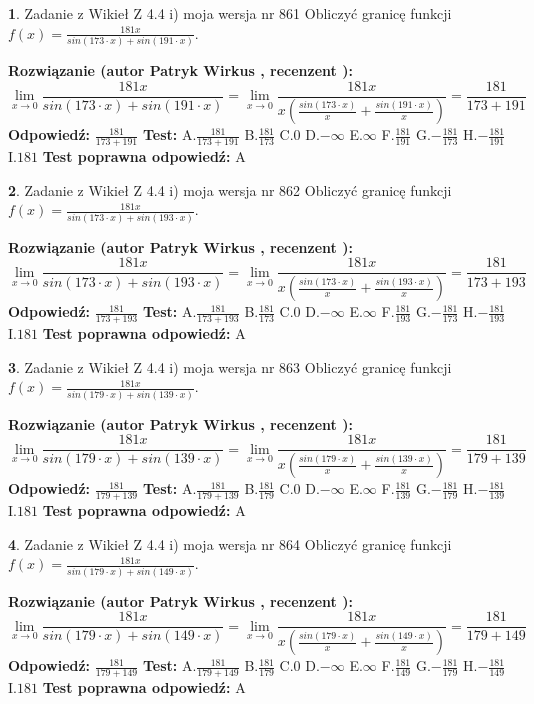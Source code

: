 \documentclass[12pt, a4paper]{article}
\theoremstyle{definition} %
\newtheorem{zad}{}
\newcommand{\zadStart}[1]{\begin{zad}#1\newline}
\newcommand{\zadStop}{\end{zad}}
\newcommand{\rozwStart}[2]{\noindent \textbf{Rozwiązanie (autor #1 , recenzent #2): }\newline}
\newcommand{\rozwStop}{\newline}
\newcommand{\odpStart}{\noindent \textbf{Odpowiedź:}\newline}
\newcommand{\odpStop}{\newline}
\newcommand{\testStart}{\noindent \textbf{Test:}\newline}
\newcommand{\testStop}{\newline}
\newcommand{\kluczStart}{\noindent \textbf{Test poprawna odpowiedź:}\newline}
\newcommand{\kluczStop}{\newline}
\begin{document}
\zadStart{Zadanie z Wikieł Z 4.4 i) moja wersja nr 861}
Obliczyć granicę funkcji $f(x)=\frac{181x}{sin(173\cdot x) +sin(191\cdot x)}$.
\zadStop
\rozwStart{Patryk Wirkus}{}
$$\lim\limits_{x\to 0}\frac{181x}{sin(173\cdot x) +sin(191\cdot x)}=\lim\limits_{x\to 0}\frac{181x}{x(\frac{sin(173\cdot x)}{x}+\frac{sin(191\cdot x)}{x})}=\frac{181}{173+191}$$
\rozwStop
\odpStart
$\frac{181}{173+191}$
\odpStop
\testStart
A.$\frac{181}{173+191}$
B.$\frac{181}{173}$
C.$0$
D.$-\infty$
E.$\infty$
F.$\frac{181}{191}$
G.$-\frac{181}{173}$
H.$-\frac{181}{191}$
I.$181$
\testStop
\kluczStart
A
\kluczStop



\zadStart{Zadanie z Wikieł Z 4.4 i) moja wersja nr 862}
Obliczyć granicę funkcji $f(x)=\frac{181x}{sin(173\cdot x) +sin(193\cdot x)}$.
\zadStop
\rozwStart{Patryk Wirkus}{}
$$\lim\limits_{x\to 0}\frac{181x}{sin(173\cdot x) +sin(193\cdot x)}=\lim\limits_{x\to 0}\frac{181x}{x(\frac{sin(173\cdot x)}{x}+\frac{sin(193\cdot x)}{x})}=\frac{181}{173+193}$$
\rozwStop
\odpStart
$\frac{181}{173+193}$
\odpStop
\testStart
A.$\frac{181}{173+193}$
B.$\frac{181}{173}$
C.$0$
D.$-\infty$
E.$\infty$
F.$\frac{181}{193}$
G.$-\frac{181}{173}$
H.$-\frac{181}{193}$
I.$181$
\testStop
\kluczStart
A
\kluczStop



\zadStart{Zadanie z Wikieł Z 4.4 i) moja wersja nr 863}
Obliczyć granicę funkcji $f(x)=\frac{181x}{sin(179\cdot x) +sin(139\cdot x)}$.
\zadStop
\rozwStart{Patryk Wirkus}{}
$$\lim\limits_{x\to 0}\frac{181x}{sin(179\cdot x) +sin(139\cdot x)}=\lim\limits_{x\to 0}\frac{181x}{x(\frac{sin(179\cdot x)}{x}+\frac{sin(139\cdot x)}{x})}=\frac{181}{179+139}$$
\rozwStop
\odpStart
$\frac{181}{179+139}$
\odpStop
\testStart
A.$\frac{181}{179+139}$
B.$\frac{181}{179}$
C.$0$
D.$-\infty$
E.$\infty$
F.$\frac{181}{139}$
G.$-\frac{181}{179}$
H.$-\frac{181}{139}$
I.$181$
\testStop
\kluczStart
A
\kluczStop



\zadStart{Zadanie z Wikieł Z 4.4 i) moja wersja nr 864}
Obliczyć granicę funkcji $f(x)=\frac{181x}{sin(179\cdot x) +sin(149\cdot x)}$.
\zadStop
\rozwStart{Patryk Wirkus}{}
$$\lim\limits_{x\to 0}\frac{181x}{sin(179\cdot x) +sin(149\cdot x)}=\lim\limits_{x\to 0}\frac{181x}{x(\frac{sin(179\cdot x)}{x}+\frac{sin(149\cdot x)}{x})}=\frac{181}{179+149}$$
\rozwStop
\odpStart
$\frac{181}{179+149}$
\odpStop
\testStart
A.$\frac{181}{179+149}$
B.$\frac{181}{179}$
C.$0$
D.$-\infty$
E.$\infty$
F.$\frac{181}{149}$
G.$-\frac{181}{179}$
H.$-\frac{181}{149}$
I.$181$
\testStop
\kluczStart
A
\kluczStop
\end{document}
